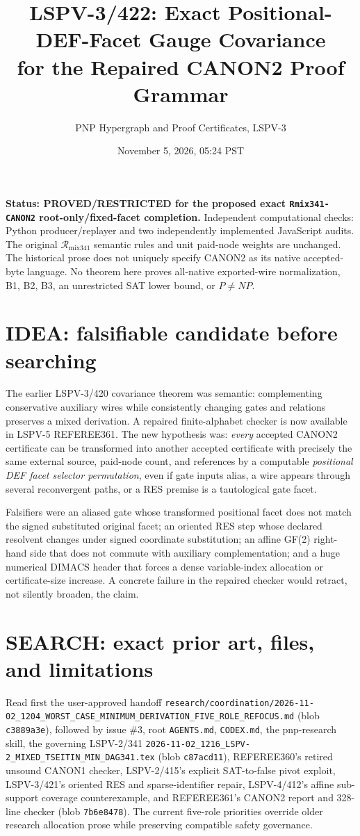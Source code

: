 \documentclass[11pt]{article}
\title{LSPV-3/422: Exact Positional-DEF-Facet Gauge Covariance\\
for the Repaired CANON2 Proof Grammar}
\author{PNP Hypergraph and Proof Certificates, LSPV-3}
\date{November 5, 2026, 05:24 PST}
\begin{document}
\maketitle

\noindent\textbf{Status: PROVED/RESTRICTED for the proposed exact
\texttt{Rmix341-CANON2} root-only/fixed-facet completion.}
Independent computational checks: Python producer/replayer and two independently implemented JavaScript audits.
The original \(\mathcal R_{\mathrm{mix341}}\) semantic rules and unit paid-node weights are unchanged.
The historical prose does not uniquely specify CANON2 as its native accepted-byte language.
No theorem here proves all-native exported-wire normalization, B1, B2, B3, an unrestricted SAT lower bound, or \(P\ne NP\).

\section*{IDEA: falsifiable candidate before searching}
The earlier LSPV-3/420 covariance theorem was semantic: complementing conservative auxiliary
wires while consistently changing gates and relations preserves a mixed derivation. A repaired
finite-alphabet checker is now available in LSPV-5 REFEREE361. The new hypothesis was:
\emph{every} accepted CANON2 certificate can be transformed into another accepted certificate
with precisely the same external source, paid-node count, and references by a computable
\emph{positional DEF facet selector permutation}, even if gate inputs alias, a wire appears
through several reconvergent paths, or a RES premise is a tautological gate facet.

Falsifiers were an aliased gate whose transformed positional facet does not match the
signed substituted original facet; an oriented RES step whose declared resolvent changes
under signed coordinate substitution; an affine GF(2) right-hand side that does not commute
with auxiliary complementation; and a huge numerical DIMACS header that forces a dense
variable-index allocation or certificate-size increase. A concrete failure in the repaired
checker would retract, not silently broaden, the claim.

\section*{SEARCH: exact prior art, files, and limitations}
Read first the user-approved handoff
\texttt{research/coordination/2026-11-02\_1204\_WORST\_CASE\_MINIMUM\_DERIVATION\_FIVE\_ROLE\_REFOCUS.md}
(blob \texttt{c3889a3e}), followed by issue \#3, root \texttt{AGENTS.md},
\texttt{CODEX.md}, the pnp-research skill, the governing LSPV-2/341
\texttt{2026-11-02\_1216\_LSPV-2\_MIXED\_TSEITIN\_MIN\_DAG341.tex}
(blob \texttt{c87acd11}), REFEREE360's retired unsound CANON1 checker,
LSPV-2/415's explicit SAT-to-false pivot exploit, LSPV-3/421's oriented
RES and sparse-identifier repair, LSPV-4/412's affine sub-support coverage
counterexample, and REFEREE361's CANON2 report and 328-line checker
(blob \texttt{7b6e8478}). The current five-role priorities override older
research allocation prose while preserving compatible safety governance.
\end{document}
